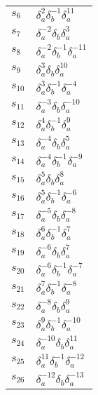 \documentclass{article}
\begin{document}
\begin{center}
\begin{tabular}{ll}
$s_{6}$ & $\delta_a^{2}\delta_b^{-1}\delta_a^{11}$ \\
$s_{7}$ & $\delta_a^{-2}\delta_b^{}\delta_a^{3}$ \\
$s_{8}$ & $\delta_a^{-2}\delta_b^{-1}\delta_a^{-11}$ \\
$s_{9}$ & $\delta_a^{3}\delta_b^{}\delta_a^{10}$ \\
$s_{10}$ & $\delta_a^{3}\delta_b^{-1}\delta_a^{-4}$ \\
$s_{11}$ & $\delta_a^{-3}\delta_b^{}\delta_a^{-10}$ \\
$s_{12}$ & $\delta_a^{4}\delta_b^{-1}\delta_a^{9}$ \\
$s_{13}$ & $\delta_a^{-4}\delta_b^{}\delta_a^{5}$ \\
$s_{14}$ & $\delta_a^{-4}\delta_b^{-1}\delta_a^{-9}$ \\
$s_{15}$ & $\delta_a^{5}\delta_b^{}\delta_a^{8}$ \\
$s_{16}$ & $\delta_a^{5}\delta_b^{-1}\delta_a^{-6}$ \\
$s_{17}$ & $\delta_a^{-5}\delta_b^{}\delta_a^{-8}$ \\
$s_{18}$ & $\delta_a^{6}\delta_b^{-1}\delta_a^{7}$ \\
$s_{19}$ & $\delta_a^{-6}\delta_b^{}\delta_a^{7}$ \\
$s_{20}$ & $\delta_a^{-6}\delta_b^{-1}\delta_a^{-7}$ \\
$s_{21}$ & $\delta_a^{7}\delta_b^{-1}\delta_a^{-8}$ \\
$s_{22}$ & $\delta_a^{-8}\delta_b^{}\delta_a^{9}$ \\
$s_{23}$ & $\delta_a^{9}\delta_b^{-1}\delta_a^{-10}$ \\
$s_{24}$ & $\delta_a^{-10}\delta_b^{}\delta_a^{11}$ \\
$s_{25}$ & $\delta_a^{11}\delta_b^{-1}\delta_a^{-12}$ \\
$s_{26}$ & $\delta_a^{-12}\delta_b^{}\delta_a^{-13}$ \\
\bottomrule
\end{tabular}
\end{center}

\thispagestyle{empty}
\end{document}
